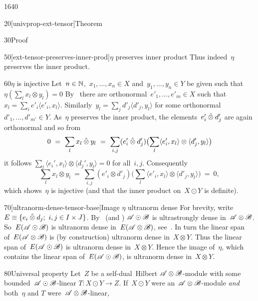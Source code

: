 \begin{parsec}{1640}
\begin{point}{20}[univprop-ext-tensor]{Theorem}
\begin{point}{30}{Proof}
\begin{point}{50}[ext-tensor-preserves-inner-prod]{$\eta$ preserves inner product}
Thus indeed~$\eta$ preserves the inner product.
\end{point}
\begin{point}{60}{$\eta$ is injective}%
Let~$n \in \mathbb{N}$,~$x_1, \ldots, x_n \in X$
    and~$y_1,\ldots, y_n \in Y$
    be given such that~$\eta(\sum_l x_l \otimes y_l) = 0$
By~
    there are orthonormal~$e'_1,\ldots, e'_m \in X$
    such that~$x_l = \sum_i e'_i \langle e'_i, x_l\rangle$.
Similarly~$y_l = \sum_j d'_j \langle d'_j, y_l\rangle$
for some orthonormal~$d'_1, \ldots, d'_{m'} \in Y$.
As~$\eta$ preserves the inner product,
    the elements~$e_i'\mathbin{\hat{\otimes}} d_j'$ are again orthonormal
    and so from
\begin{equation*}
    0 \ =\  \sum_l x_l \mathbin{\hat{\otimes}} y_l
    \ =\  \sum_{i,j} (e'_i \mathbin{\hat{\otimes}} d'_j) \bigl(\sum_l
         \langle e'_i, x_l\rangle \otimes \langle d'_j, y_l\rangle\bigr)
\end{equation*}
         it follows
         $\sum_l \langle e_i',x_l\rangle \otimes \langle d_j',y_l\rangle = 0$
         for all~$i,j$.
Consequently
\begin{equation*}
    \sum_l x_l \otimes y_l
        \ =\  \sum_{i,j} (e'_i \otimes d'_j) \bigl(\sum_l
        \langle e'_i, x_l \rangle \otimes \langle d'_j, y_l \rangle 
        \bigr) \ = \ 0,
\end{equation*}
which shows~$\eta$ is injective
    (and that the inner product on~$X \odot Y$ is definite).
\end{point}
\begin{point}{70}[ultranorm-dense-tensor-base]{Image $\eta$ ultranorm dense}%
For brevity, write~$E \equiv \{ e_i \mathbin{\hat{\otimes}} d_j; \ i,j \in I\times J\}$.
By~ (and )
    $\mathscr{A} \odot \mathscr{B}$ is ultrastrongly dense in~$\mathscr{A} \otimes \mathscr{B}$.
So~$E (\mathscr{A} \odot \mathscr{B})$
    is ultranorm dense in~$E (\mathscr{A} \otimes \mathscr{B})$,
    see~.
In turn the linear span of~$E (\mathscr{A} \otimes \mathscr{B})$
    is (by construction) ultranorm dense in~$X \otimes Y$.
Thus the linear span of~$E (\mathscr{A} \odot \mathscr{B})$
    is ultranorm dense in~$X \otimes Y$.
Hence the image of~$\eta$,
    which contains the linear span of~$E (\mathscr{A} \odot \mathscr{B})$,
    is ultranorm dense in~$X \otimes Y$.
\end{point}
\begin{point}{80}{Universal property}%
Let~$Z$ be a self-dual~Hilbert $\mathscr{A} \otimes \mathscr{B}$-module
 with some bounded~$\mathscr{A} \odot \mathscr{B}$-linear $T\colon X \odot Y \to Z$.
If~$X \odot Y$ were an~$\mathscr{A} \otimes \mathscr{B}$-module
    \emph{and} both~$\eta$ and $T$ were~$\mathscr{A} \otimes \mathscr{B}$-linear,

\end{point}
\end{point}
\end{point}
\end{parsec}
